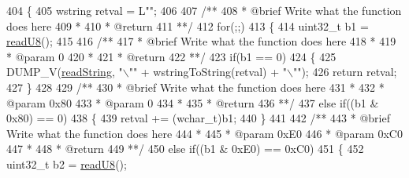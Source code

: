 \begin{DoxyCode}
404         \{
405             wstring retval = L\textcolor{stringliteral}{""};
406 \textcolor{comment}{}
407 \textcolor{comment}{            /**}
408 \textcolor{comment}{             * @brief Write what the function does here}
409 \textcolor{comment}{             *}
410 \textcolor{comment}{             * @return}
411 \textcolor{comment}{             **/}
412             \textcolor{keywordflow}{for}(;;)
413             \{
414                 uint32\_t b1 = \hyperlink{classReader_a32e2703dfc40dd59216b648a0cf7ce2c}{readU8}();
415 \textcolor{comment}{}
416 \textcolor{comment}{                /**}
417 \textcolor{comment}{                 * @brief Write what the function does here}
418 \textcolor{comment}{                 *}
419 \textcolor{comment}{                 * @param 0}
420 \textcolor{comment}{                 *}
421 \textcolor{comment}{                 * @return}
422 \textcolor{comment}{                 **/}
423                 \textcolor{keywordflow}{if}(b1 == 0)
424                 \{
425                     DUMP\_V(\hyperlink{classReader_a4c128181d159e7581b89aa796a8de7ab}{readString}, \textcolor{stringliteral}{"\(\backslash\)""} + wstringToString(retval) + \textcolor{stringliteral}{"\(\backslash\)""});
426                     \textcolor{keywordflow}{return} retval;
427                 \}
428 \textcolor{comment}{}
429 \textcolor{comment}{                /**}
430 \textcolor{comment}{                 * @brief Write what the function does here}
431 \textcolor{comment}{                 *}
432 \textcolor{comment}{                 * @param 0x80}
433 \textcolor{comment}{                 * @param 0}
434 \textcolor{comment}{                 *}
435 \textcolor{comment}{                 * @return}
436 \textcolor{comment}{                 **/}
437                 \textcolor{keywordflow}{else} \textcolor{keywordflow}{if}((b1 & 0x80) == 0)
438                 \{
439                     retval += (wchar\_t)b1;
440                 \}
441 \textcolor{comment}{}
442 \textcolor{comment}{                /**}
443 \textcolor{comment}{                 * @brief Write what the function does here}
444 \textcolor{comment}{                 *}
445 \textcolor{comment}{                 * @param 0xE0}
446 \textcolor{comment}{                 * @param 0xC0}
447 \textcolor{comment}{                 *}
448 \textcolor{comment}{                 * @return}
449 \textcolor{comment}{                 **/}
450                 \textcolor{keywordflow}{else} \textcolor{keywordflow}{if}((b1 & 0xE0) == 0xC0)
451                 \{
452                     uint32\_t b2 = \hyperlink{classReader_a32e2703dfc40dd59216b648a0cf7ce2c}{readU8}();

\end{DoxyCode}

